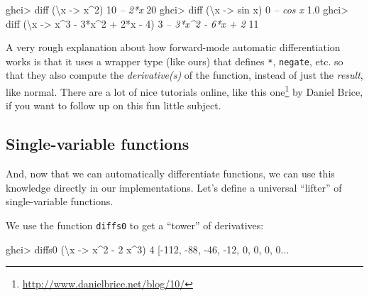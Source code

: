 \documentclass[]{article}
\newenvironment{Shaded}{}{}
\newcommand{\CommentTok}[1]{\textcolor[rgb]{0.38,0.63,0.69}{\textit{#1}}}
\newcommand{\DecValTok}[1]{\textcolor[rgb]{0.25,0.63,0.44}{#1}}
\newcommand{\FloatTok}[1]{\textcolor[rgb]{0.25,0.63,0.44}{#1}}
\newcommand{\FunctionTok}[1]{\textcolor[rgb]{0.02,0.16,0.49}{#1}}
\newcommand{\NormalTok}[1]{#1}
\newcommand{\OtherTok}[1]{\textcolor[rgb]{0.00,0.44,0.13}{#1}}
\renewcommand{\href}[2]{#2\footnote{\url{#1}}}
\begin{document}
\begin{Shaded}
\begin{Highlighting}[]
\NormalTok{ghci}\FunctionTok{>}\NormalTok{ diff (\textbackslash{}x }\OtherTok{->}\NormalTok{ x}\FunctionTok{^}\DecValTok{2}\NormalTok{) }\DecValTok{10}       \CommentTok{-- 2*x}
\DecValTok{20}
\NormalTok{ghci}\FunctionTok{>}\NormalTok{ diff (\textbackslash{}x }\OtherTok{->}\NormalTok{ sin x) }\DecValTok{0}      \CommentTok{-- cos x}
\FloatTok{1.0}
\NormalTok{ghci}\FunctionTok{>}\NormalTok{ diff (\textbackslash{}x }\OtherTok{->}\NormalTok{ x}\FunctionTok{^}\DecValTok{3} \FunctionTok{-} \DecValTok{3}\FunctionTok{*}\NormalTok{x}\FunctionTok{^}\DecValTok{2} \FunctionTok{+} \DecValTok{2}\FunctionTok{*}\NormalTok{x }\FunctionTok{-} \DecValTok{4}\NormalTok{) }\DecValTok{3}  \CommentTok{-- 3*x^2 - 6*x + 2}
\DecValTok{11}
\end{Highlighting}
\end{Shaded}

A very rough explanation about how forward-mode automatic differentiation works
is that it uses a wrapper type (like ours) that defines \texttt{*},
\texttt{negate}, etc. so that they also compute the \emph{derivative(s)} of the
function, instead of just the \emph{result}, like normal. There are a lot of
nice tutorials online, like \href{http://www.danielbrice.net/blog/10/}{this one}
by Daniel Brice, if you want to follow up on this fun little subject.

\hypertarget{single-variable-functions}{%
\subsection{Single-variable functions}\label{single-variable-functions}}

And, now that we can automatically differentiate functions, we can use this
knowledge directly in our implementations. Let's define a universal ``lifter''
of single-variable functions.

We use the function \texttt{diffs0} to get a ``tower'' of derivatives:

\begin{Shaded}
\begin{Highlighting}[]
\NormalTok{ghci}\FunctionTok{>}\NormalTok{ diffs0 (\textbackslash{}x }\OtherTok{->}\NormalTok{ x}\FunctionTok{^}\DecValTok{2} \FunctionTok{-} \DecValTok{2}\NormalTok{ x}\FunctionTok{^}\DecValTok{3}\NormalTok{) }\DecValTok{4}
\NormalTok{[}\FunctionTok{-}\DecValTok{112}\NormalTok{, }\FunctionTok{-}\DecValTok{88}\NormalTok{, }\FunctionTok{-}\DecValTok{46}\NormalTok{, }\FunctionTok{-}\DecValTok{12}\NormalTok{, }\DecValTok{0}\NormalTok{, }\DecValTok{0}\NormalTok{, }\DecValTok{0}\NormalTok{, }\DecValTok{0}\FunctionTok{...}
\end{Highlighting}
\end{Shaded}
\end{document}
